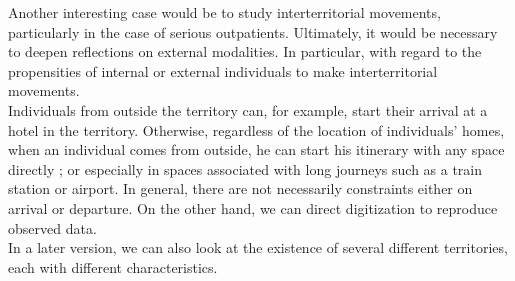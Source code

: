 Another interesting case would be to study interterritorial movements, particularly in the case of serious outpatients. Ultimately, it would be necessary to deepen reflections on external modalities. In particular, with regard to the propensities of internal or external individuals to make interterritorial movements.\\

Individuals from outside the territory can, for example, start their arrival at a hotel in the territory. Otherwise, regardless of the location of individuals' homes, when an individual comes from outside, he can start his itinerary with any space directly ; or especially in spaces associated with long journeys such as a train station or airport. In general, there are not necessarily constraints either on arrival or departure. On the other hand, we can direct digitization to reproduce observed data.\\

In a later version, we can also look at the existence of several different territories, each with different characteristics.